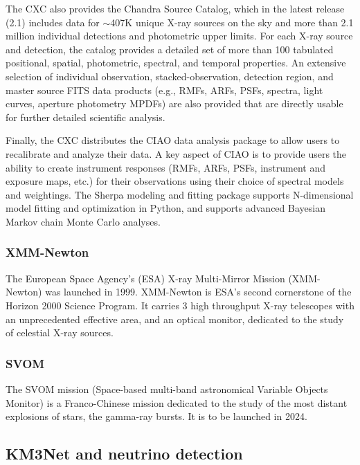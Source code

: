 \documentclass[11pt,a4paper]{ivoa}
\begin{document}
The CXC also provides the Chandra Source Catalog, which in the latest release (2.1) includes data for $\sim$407K unique X-ray sources on the sky and more than 2.1 million individual detections and photometric upper limits.  For each X-ray source and detection, the catalog provides a detailed set of more than 100 tabulated positional, spatial, photometric, spectral, and temporal properties.  An extensive selection of individual observation, stacked-observation, detection region, and master source FITS data products (e.g., RMFs, ARFs, PSFs, spectra, light curves, aperture photometry MPDFs) are also provided that are directly usable for further detailed scientific analysis.

Finally, the CXC distributes the CIAO data analysis package to allow users to recalibrate and analyze their data.  A key aspect of CIAO is to provide users the ability to create instrument responses (RMFs, ARFs, PSFs, instrument and exposure maps, etc.) for their observations using their choice of spectral models and weightings.  The Sherpa modeling and fitting package supports N-dimensional model fitting and optimization in Python, and supports advanced Bayesian Markov chain Monte Carlo analyses.  


\subsubsection{XMM-Newton}

The European Space Agency's (ESA) X-ray Multi-Mirror Mission (XMM-Newton) was launched in 1999. XMM-Newton is ESA's second cornerstone of the Horizon 2000 Science Program. It carries 3 high throughput X-ray telescopes with an unprecedented effective area, and an optical monitor, dedicated to the study of celestial X-ray sources.



\subsubsection{SVOM}

The SVOM mission (Space-based multi-band astronomical Variable Objects Monitor) is a Franco-Chinese mission dedicated to the study of the most distant explosions of stars, the gamma-ray bursts. It is to be launched in 2024.




\subsection{KM3Net and neutrino detection}
\end{document}
